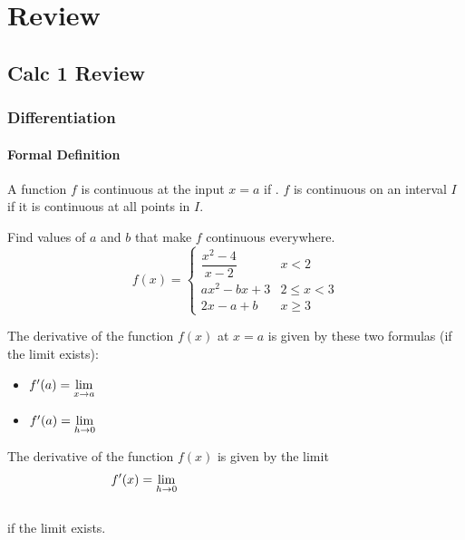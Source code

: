 \documentclass[notes]{subfiles}
\begin{document}
	\chapter{Review}
	\setcounter{section}{0}
	\setcounter{page}{1}
	\fancyhead[LO,RE]{\bfseries \small \currentname}
	\fancyfoot[C]{{}}
	\fancyfoot[RO,LE]{\large \thepage}	%
	
\section*{Calc 1 Review}\label{csr}
	\subsection*{Differentiation}
	\subsubsection*{Formal Definition}
		\begin{defn}[Continuity]
			A function $f$ is continuous at the input $x =a$ if .  $f$ is continuous on an interval $I$ if it is continuous at all points in $I$.
		\end{defn}
		\begin{ex}
			Find values of $a$ and $b$ that make $f$ continuous everywhere.
				\[f(x) = \begin{cases}\dfrac{x^2-4}{x-2} & x < 2 \\ ax^2 - bx +  3& 2\leq x < 3 \\ 2x - a + b & x \geq 3 \end{cases}\]
		\end{ex}
			
		\begin{defn}[Derivative of $f$ at $x =a$]
			The derivative of the function $f(x)$ at $x =a$ is given by these two formulas (if the limit exists):\\[15pt]
			\begin{itemize}
				\setlength \itemsep{25pt}
				
				\item $f'(a) = \displaystyle \lim_{x\to a}$
				\item $f'(a) = \displaystyle \lim_{h\to 0}$
			\end{itemize}
		\end{defn}
			\newpage
			
		\begin{defn}
			The derivative of the function $f(x)$ is given by the limit\\[15pt]
				\[f'(x) = \displaystyle \lim_{h\to 0} \hspace{2in}\]
				\\
			if the limit exists.
		\end{defn}
		
\end{document}

